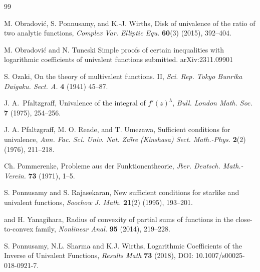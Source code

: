 \documentclass[a4paper,12pt]{amsart}
\theoremstyle{definition}
\numberwithin{equation}{section}
\begin{document}
\begin{thebibliography}{99}

{\sc M. Obradovi\'{c}, S. Ponnusamy,} and {\sc K.-J. Wirths,}
{Disk of univalence of the ratio of two analytic functions}, {\em Complex Var. Elliptic Equ.} \textbf{60}(3) (2015), 392--404.
%

 {\sc M. Obradovi\'{c}} and {\sc N. Tuneski}
Simple proofs of certain inequalities with logarithmic coefficients
of univalent functions submitted. arXiv:2311.09901

 {\sc S. Ozaki,} 
{On the theory of multivalent functions. II},
{\em Sci. Rep. Tokyo Bunrika Daigaku. Sect. A.} \textbf{4} (1941) 45--87.


 {\sc J. A.~Pfaltzgraff},
{Univalence of the integral of $f'(z)^{\lambda}$},
{\em Bull. London Math. Soc.} {\bf 7} (1975), 254--256.



 {\sc J. A. Pfaltzgraff, M. O. Reade,} and {\sc T. Umezawa},
{Sufficient conditions for univalence},
{\em Ann. Fac. Sci. Univ. Nat. Za\"{i\"}re (Kinshasa) Sect. Math.-Phys.} \textbf{2}(2) (1976), 211--218.

 {\sc Ch. Pommerenke},
{Probleme aus der Funktionentheorie},
{\em Jber. Deutsch. Math.-Verein.} {\bf 73} (1971), 1--5.	
	

 {\sc S. Ponnusamy} and {\sc S. Rajasekaran},
{New sufficient conditions for starlike and univalent functions},
{\em Soochow J. Math.} \textbf{21}(2) (1995), 193--201.

 and {\sc H. Yanagihara},
{Radius of convexity of partial sums of functions in the close-to-convex family},
{\em Nonlinear Anal.} {\bf 95} (2014), 219--228.

	{\sc S. Ponnusamy}, {\sc N.L.  Sharma} and {\sc K.J. Wirths}, Logarithmic Coefficients of the Inverse of Univalent Functions, {\it Results Math} {\bf 73} (2018), DOI: 10.1007/s00025-018-0921-7.
%


\end{thebibliography}
\end{document}
